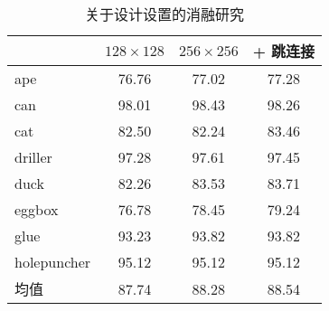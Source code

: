 \begin{table}[htbp]
    \centering
     \caption{关于设计设置的消融研究}
    \begin{tabular}{lccc}
    \toprule 
    & $128\times128$ & $256\times256$ & + 跳连接 \\
    \midrule
    ape & 76.76 & 77.02 & 77.28 \\
    can & 98.01 & 98.43 & 98.26 \\
    cat & 82.50 & 82.24 & 83.46 \\
    driller & 97.28 & 97.61 & 97.45 \\
    duck & 82.26 & 83.53 & 83.71 \\
    eggbox & 76.78 & 78.45 & 79.24 \\
    glue & 93.23 & 93.82 & 93.82 \\
    holepuncher & 95.12 & 95.12 & 95.12 \\
    \midrule
    均值 & 87.74 & 88.28 & 88.54 \\
    \bottomrule
  \end{tabular}
  \label{tab:main_ablation}
\end{table}